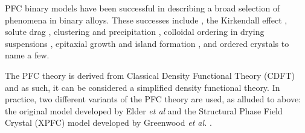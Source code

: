 
  PFC binary models have been 
successful in describing a broad selection of phenomena in binary alloys.
These successes include ,
 the Kirkendall effect \cite{ELDER11_KIRKENDALL, LU15},
solute drag \cite{GREENWOOD12}, clustering and precipitation \cite{FALLAH12,
FALLAH13, FALLAH13_AlCu_experiment}, colloidal ordering in drying suspensions
\cite{GANAI13}, epitaxial growth and island formation \cite{ELDER10_NANOISLAND,
LU16}, and ordered crystals \cite{ALSTER17} to name a few. 

The PFC theory is derived from Classical Density Functional Theory (CDFT) and as
such, it can be considered a simplified density functional theory. 
In practice, two different variants of the PFC theory are used, as alluded to above: the 
original model developed by Elder \textit{et al} \cite{ELDER07} and the Structural Phase 
Field Crystal (XPFC) model developed by Greenwood \textit{et al.} \cite{GREENWOOD11_BINARY}.

